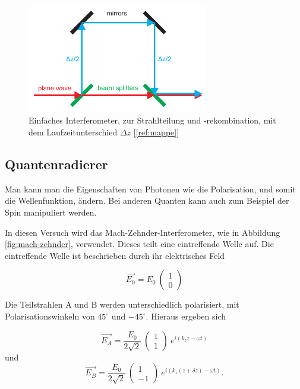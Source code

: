 \documentclass[a4paper,ngerman]{scrartcl}
\begin{document}
\begin{figure}
\includegraphics[width=0.7\textwidth]{interferomter-einfach.png}
\caption{Einfaches Interferometer, zur Strahlteilung und -rekombination, mit dem Laufzeitunterschied $\Delta z$ [\ref{ref:mappe}]}
\label{fig: Interferometer-einfach}
\end{figure}

\subsection{Quantenradierer}
\label{ssec:quantenradierer}

Man kann man die Eigenschaften von Photonen wie die Polarisation, und somit die Wellenfunktion, ändern. 
Bei anderen Quanten kann auch zum Beispiel der Spin manipuliert werden.

In diesen Versuch wird das Mach-Zehnder-Interferometer, wie in Abbildung \ref{fig:mach-zehnder}, verwendet. Dieses teilt eine eintreffende Welle auf. Die eintreffende Welle ist beschrieben durch ihr elektrisches Feld
 
\begin{equation}
\vec{E_0} = E_0 \ \begin{pmatrix} 1\\ 0 \end{pmatrix}
\end{equation}

Die Teilstrahlen A 	und B werden unterschiedlich polarisiert, mit Polarisationswinkeln von $45^{\circ}$ und $-45^{\circ}$. 
Hieraus ergeben sich

\begin{equation}
\vec{E_A} = \frac{E_0}{2 \sqrt{2}} \ \begin{pmatrix} 1\\ 1 \end{pmatrix} \ e^{i (k_z z -\omega t)}
\end{equation}
und
\begin{equation}
\vec{E_B} = \frac{E_0}{2 \sqrt{2}} \ \begin{pmatrix} 1\\ -1 \end{pmatrix} \ e^{i (k_z (z + \delta z) -\omega t)} .
\end{equation}
\end{document}
